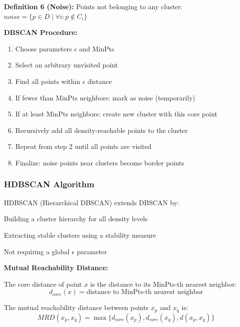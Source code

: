     \textbf{Definition 6 (Noise):} Points not belonging to any cluster: $noise = \{p \in D \mid \forall i: p \notin C_i\}$

    
    \textbf{DBSCAN Procedure:}
    \begin{enumerate}
        \item Choose parameters $\epsilon$ and MinPts
        \item Select an arbitrary unvisited point
        \item Find all points within $\epsilon$ distance
        \item If fewer than MinPts neighbors: mark as noise (temporarily)
        \item If at least MinPts neighbors: create new cluster with this core point
        \item Recursively add all density-reachable points to the cluster
        \item Repeat from step 2 until all points are visited
        \item Finalize: noise points near clusters become border points
    \end{enumerate}
    
    \subsubsection{HDBSCAN Algorithm}
    
    HDBSCAN (Hierarchical DBSCAN) extends DBSCAN by:
    \begin{compactitemize}
        \item Building a cluster hierarchy for all density levels
        \item Extracting stable clusters using a stability measure
        \item Not requiring a global $\epsilon$ parameter
    \end{compactitemize}
    
    \textbf{Mutual Reachability Distance:}
    
    The core distance of point $x$ is the distance to its MinPts-th nearest neighbor:
    \begin{equation}
    d_{core}(x) = \text{distance to MinPts-th nearest neighbor}
    \end{equation}
    
    The mutual reachability distance between points $x_p$ and $x_q$ is:
    \begin{equation}
    MRD(x_p, x_q) = \max\{d_{core}(x_p), d_{core}(x_q), d(x_p, x_q)\}
    \end{equation}
    
